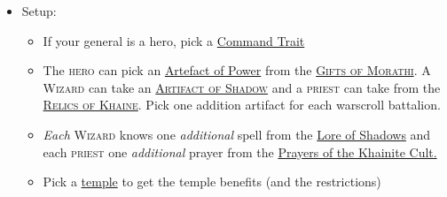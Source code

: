 

\begin{itemize}
\item Setup: 
    \begin{itemize}
        \item If your general is a hero, pick
            a \hyperref[command-traits]{Command Trait}
        \item The \textsc{hero} can pick an
            \hyperref[artefacts-of-power]{Artefact of Power} from the
            \hyperref[gifts-of-morathi]{\textsc{Gifts of Morathi}}.
            A \textsc{Wizard} can take an
            \hyperref[artifact-of-shadow]{\textsc{Artifact of Shadow}} and
            a \textsc{priest} can take from the
            \hyperref[relics-of-khaine]{\textsc{Relics of Khaine}}. Pick one
            addition artifact for each warscroll battalion.
        \item \emph{Each} \textsc{Wizard} knows one \emph{additional} spell
            from the \hyperref[lore-of-shadows]{Lore of Shadows} and each
            \textsc{priest} one \emph{additional} prayer from the
            \hyperref[prayers-of-the-khainite-cult]{Prayers of the Khainite
            Cult.}
        \item Pick a \hyperref[temple]{temple} to get the temple benefits (and
            the restrictions)
    \end{itemize}


\end{itemize}
